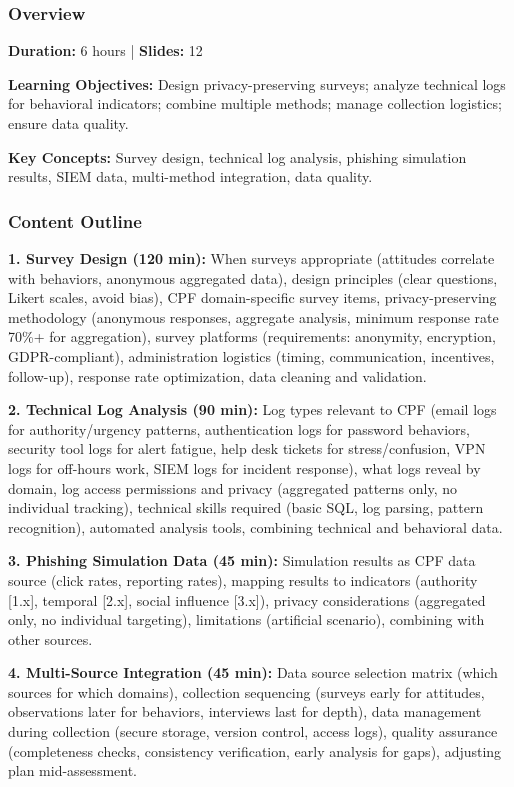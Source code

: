 \documentclass[11pt,a4paper]{article}
\begin{document}
\subsubsection{Overview}
\textbf{Duration:} 6 hours | \textbf{Slides:} 12

\textbf{Learning Objectives:} Design privacy-preserving surveys; analyze technical logs for behavioral indicators; combine multiple methods; manage collection logistics; ensure data quality.

\textbf{Key Concepts:} Survey design, technical log analysis, phishing simulation results, SIEM data, multi-method integration, data quality.

\subsubsection{Content Outline}

\textbf{1. Survey Design (120 min):} When surveys appropriate (attitudes correlate with behaviors, anonymous aggregated data), design principles (clear questions, Likert scales, avoid bias), CPF domain-specific survey items, privacy-preserving methodology (anonymous responses, aggregate analysis, minimum response rate 70\%+ for aggregation), survey platforms (requirements: anonymity, encryption, GDPR-compliant), administration logistics (timing, communication, incentives, follow-up), response rate optimization, data cleaning and validation.

\textbf{2. Technical Log Analysis (90 min):} Log types relevant to CPF (email logs for authority/urgency patterns, authentication logs for password behaviors, security tool logs for alert fatigue, help desk tickets for stress/confusion, VPN logs for off-hours work, SIEM logs for incident response), what logs reveal by domain, log access permissions and privacy (aggregated patterns only, no individual tracking), technical skills required (basic SQL, log parsing, pattern recognition), automated analysis tools, combining technical and behavioral data.

\textbf{3. Phishing Simulation Data (45 min):} Simulation results as CPF data source (click rates, reporting rates), mapping results to indicators (authority [1.x], temporal [2.x], social influence [3.x]), privacy considerations (aggregated only, no individual targeting), limitations (artificial scenario), combining with other sources.

\textbf{4. Multi-Source Integration (45 min):} Data source selection matrix (which sources for which domains), collection sequencing (surveys early for attitudes, observations later for behaviors, interviews last for depth), data management during collection (secure storage, version control, access logs), quality assurance (completeness checks, consistency verification, early analysis for gaps), adjusting plan mid-assessment.
\end{document}

